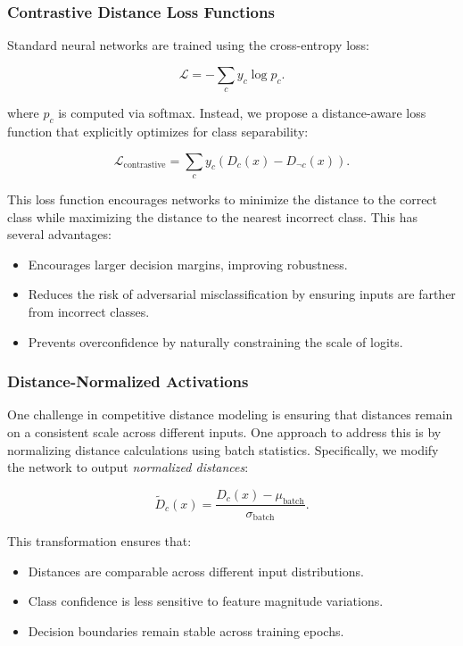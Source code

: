 \documentclass[12pt]{article}
\begin{document}
\subsubsection{Contrastive Distance Loss Functions}

Standard neural networks are trained using the cross-entropy loss:

\[
\mathcal{L} = -\sum_c y_c \log p_c.
\]

where \( p_c \) is computed via softmax. Instead, we propose a distance-aware loss function that explicitly optimizes for class separability:

\[
\mathcal{L}_{\text{contrastive}} = \sum_c y_c (D_c(x) - D_{\neg c}(x)).
\]

This loss function encourages networks to minimize the distance to the correct class while maximizing the distance to the nearest incorrect class. This has several advantages:

\begin{itemize}
    \item Encourages larger decision margins, improving robustness.
    \item Reduces the risk of adversarial misclassification by ensuring inputs are farther from incorrect classes.
    \item Prevents overconfidence by naturally constraining the scale of logits.
\end{itemize}

\subsubsection{Distance-Normalized Activations}

One challenge in competitive distance modeling is ensuring that distances remain on a consistent scale across different inputs. One approach to address this is by normalizing distance calculations using batch statistics. Specifically, we modify the network to output \textit{normalized distances}:

\[
\tilde{D}_c(x) = \frac{D_c(x) - \mu_{\text{batch}}}{\sigma_{\text{batch}}}.
\]

This transformation ensures that:

\begin{itemize}
    \item Distances are comparable across different input distributions.
    \item Class confidence is less sensitive to feature magnitude variations.
    \item Decision boundaries remain stable across training epochs.
\end{itemize}
\end{document}
